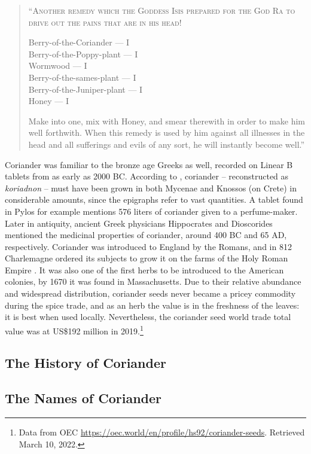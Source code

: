 \begin{quote}
\textsc{``Another remedy which the Goddess Isis prepared for the God Ra to drive out the pains that are in his head!}

\smallskip
Berry-of-the-Coriander --- I\\
Berry-of-the-Poppy-plant --- I\\
Wormwood --- I\\
Berry-of-the-sames-plant --- I\\
Berry-of-the-Juniper-plant --- I\\
Honey --- I
\smallskip

Make into one, mix with Honey, and smear therewith in order to make him well forthwith. When this remedy is used by him against all illnesses in the head and all sufferings and evils of any sort, he will instantly become well.'' \textcite[40]{bryan_papyrus_1930}
\end{quote}

\noindent Coriander was familiar to the bronze age Greeks as well, recorded on Linear B tablets from as early as 2000 BC. According to \textcite{chadwick_mycenaean_1976}, coriander -- reconstructed as \textit{koriadnon} -- must have been grown in both Mycenae and Knossos (on Crete) in considerable amounts, since the epigraphs refer to vast quantities. A tablet found in Pylos for example mentions 576 liters of coriander given to a perfume-maker. Later in antiquity, ancient Greek physicians Hippocrates and Dioscorides mentioned the medicinal properties of coriander, around 400 BC and 65 AD, respectively. Coriander was introduced to England by the Romans, and in 812 Charlemagne ordered its subjects to grow it on the farms of the Holy Roman Empire \parencite{prance_cultural_2005}. It was also one of the first herbs to be introduced to the American colonies, by 1670 it was found in Massachusetts. Due to their relative abundance and widespread distribution, coriander seeds never became a pricey commodity during the spice trade, and as an herb the value is in the freshness of the leaves: it is best when used locally. Nevertheless, the coriander seed world trade total value was at US\$192 million in 2019.\footnote{Data from OEC \url{https://oec.world/en/profile/hs92/coriander-seeds}. Retrieved March 10, 2022.}

\subsection{The History of Coriander}

\subsection{The Names of Coriander}

